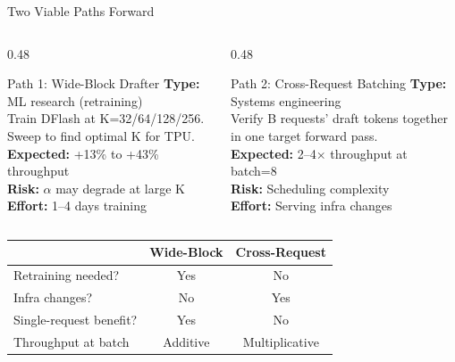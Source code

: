 \documentclass[10pt]{beamer}
\begin{document}
\begin{frame}{Two Viable Paths Forward}

\begin{columns}[T]
\begin{column}{0.48\textwidth}
\begin{block}{Path 1: Wide-Block Drafter}
\footnotesize
\textbf{Type:} ML research (retraining)\\[0.3em]
Train DFlash at K=32/64/128/256.\\
Sweep to find optimal K for TPU.\\[0.3em]
\textbf{Expected:} +13\% to +43\% throughput\\
\textbf{Risk:} $\alpha$ may degrade at large K\\
\textbf{Effort:} 1--4 days training
\end{block}
\end{column}
\begin{column}{0.48\textwidth}
\begin{block}{Path 2: Cross-Request Batching}
\footnotesize
\textbf{Type:} Systems engineering\\[0.3em]
Verify B requests' draft tokens together in one target forward pass.\\[0.3em]
\textbf{Expected:} 2--4$\times$ throughput at batch=8\\
\textbf{Risk:} Scheduling complexity\\
\textbf{Effort:} Serving infra changes
\end{block}
\end{column}
\end{columns}

\vspace{0.8em}
\centering
\footnotesize
\begin{tabular}{l cc}
\toprule
& \textbf{Wide-Block} & \textbf{Cross-Request} \\
\midrule
Retraining needed? & Yes & No \\
Infra changes? & No & Yes \\
Single-request benefit? & Yes & No \\
Throughput at batch & Additive & Multiplicative \\
\bottomrule
\end{tabular}
\end{frame}
\end{document}
